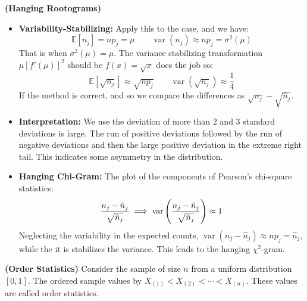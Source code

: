 \begin{definition}{\textbf{(Hanging Rootograms)}}
\begin{itemize}
        \item \textbf{Variability-Stabilizing:} Apply this to the case, and we have:
        \begin{equation*}
            \mathbb{E}[n_j] = np_j = \mu \qquad \operatorname{var}(n_j) \approx np_j = \sigma^2(\mu)
        \end{equation*}
        That is when $\sigma^2(\mu) = \mu$. The variance stabilizing transformation $\mu[f'(\mu)]^2$ should be $f(x) = \sqrt{x }$ does the job so:
        \begin{equation*}
            \mathbb{E}[\sqrt{n_j}] \approx \sqrt{np_j} \qquad \operatorname{var}(\sqrt{n_j}) \approx \frac{1}{4}
        \end{equation*}
        If the method is correct, and so we compare the differences as $\sqrt{n_j} - \sqrt{\hat{n}_j}$. 
        \item \textbf{Interpretation:} We use the deviation of more than $2$ and $3$ standard deviations is large. The run of positive deviations followed by the run of negative deviations and then the large positive deviation in the extreme right tail. This indicates some asymmetry in the distribution. 
        \item \textbf{Hanging Chi-Gram:} The plot of the components of Pearson's chi-square statistics:
        \begin{equation*}
            \frac{n_j - \hat{n}_j}{\sqrt{\hat{n}_j}}
            \implies \operatorname{var}\left( \frac{n_j-\hat{n}_j}{\sqrt{\hat{n}_j}} \right) \approx 1
        \end{equation*}
        Neglecting the variability in the expected counts, $\operatorname{var}(n_j-\hat{n}_j)\approx np_j = \hat{n}_j$, while the it is stabilizes the variance. This leads to the hanging $\chi^2$-gram.
    \end{itemize}
\end{definition}

\begin{definition}{\textbf{(Order Statistics)}}
    Consider the sample of size $n$ from a uniform distribution $[0, 1]$. The ordered sample values by $X_{(1)} < X_{(2)} < \cdots < X_{(n)}$. These values are called order statistics. 
\end{definition}

